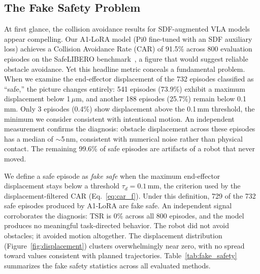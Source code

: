 \subsection{The Fake Safety Problem}\label{sec:fake_safety}

At first glance, the collision avoidance results for SDF-augmented VLA models appear compelling. Our A1-LoRA model (Pi0 fine-tuned with an SDF auxiliary loss) achieves a Collision Avoidance Rate (CAR) of 91.5\% across 800 evaluation episodes on the SafeLIBERO benchmark~\cite{hu2025vlsa}, a figure that would suggest reliable obstacle avoidance. Yet this headline metric conceals a fundamental problem. When we examine the end-effector displacement of the 732 episodes classified as ``safe,'' the picture changes entirely: 541 episodes (73.9\%) exhibit a maximum displacement below 1\,$\mu$m, and another 188 episodes (25.7\%) remain below 0.1\,mm. Only 3 episodes (0.4\%) show displacement above the 0.1\,mm threshold, the minimum we consider consistent with intentional motion. An independent measurement confirms the diagnosis: obstacle displacement across these episodes has a median of ${\sim}$5\,nm, consistent with numerical noise rather than physical contact. The remaining 99.6\% of safe episodes are artifacts of a robot that never moved.

We define a safe episode as \emph{fake safe} when the maximum end-effector displacement stays below a threshold $\tau_d = 0.1$\,mm, the criterion used by the displacement-filtered CAR (Eq.~\ref{eq:car_f}). Under this definition, 729 of the 732 safe episodes produced by A1-LoRA are fake safe. An independent signal corroborates the diagnosis: TSR is 0\% across all 800 episodes, and the model produces no meaningful task-directed behavior. The robot did not avoid obstacles; it avoided motion altogether. The displacement distribution (Figure~\ref{fig:displacement}) clusters overwhelmingly near zero, with no spread toward values consistent with planned trajectories. Table~\ref{tab:fake_safety} summarizes the fake safety statistics across all evaluated methods.

